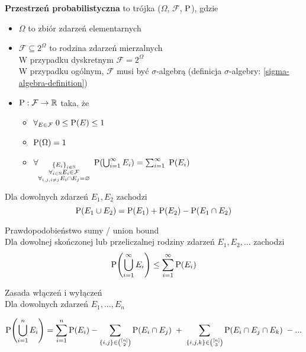 \begin{definition}
	\textbf{Przestrzeń probabilistyczna} to trójka (\(\Omega\), \(\mathcal{F}\), \(\operatorname{P}\)), gdzie
	\begin{itemize}
		\item \(\Omega\) to zbiór zdarzeń elementarnych
		\item \(\mathcal{F} \subseteq 2^{\Omega}\) to rodzina zdarzeń mierzalnych\\
		W przypadku dyskretnym \(\mathcal{F} = 2^{\Omega}\)\\
		W przypadku ogólnym, \(\mathcal{F}\) musi być \(\sigma\)-algebrą (definicja \(\sigma\)-algebry: \ref{sigma-algebra-definition})
		\item \(\operatorname{P} : \mathcal{F} \to \mathbb{R}\) taka, że
		\begin{itemize}
			\item \(\forall_{E \in \mathcal{F}} \; 0 \leq \operatorname{P}(E) \leq 1\)
			\item \(\operatorname{P}(\Omega) = 1\)
			\item \(\forall_{\substack{\set{E_i}_{i \in \natural} \\ \forall_{i \in \natural} E_i \in \mathcal{F} \\ \forall_{i, j, i \not= j} E_i \cap E_j = \emptyset}} \; \prob(\bigcup_{i=1}^\infty E_i) = \sum_{i=1}^\infty \; \prob(E_i)\)
		\end{itemize}
	\end{itemize}
\end{definition}

\begin{lemma}
	Dla dowolnych zdarzeń \(E_1, E_2\) zachodzi
	\[
		\operatorname{P}(E_1 \cup E_2) = \operatorname{P}(E_1) + \operatorname{P}(E_2) - \operatorname{P}(E_1 \cap E_2)
	\]
\end{lemma} 

\begin{lemma} Prawdopodobieństwo sumy / union bound \\
	\label{union-bound}
	Dla dowolnej skończonej lub przeliczalnej rodziny zdarzeń \(E_1, E_2, ...\) zachodzi
	\[
		\prob\pars{\bigcup_{i=1}^\infty E_i} \leq \sum_{i=1}^\infty \prob\pars{E_i}
	\]
\end{lemma}

\begin{lemma} Zasada włączeń i wyłączeń \\
	Dla dowolnych zdarzeń \(E_1, ..., E_n\)
	
	\[
		\prob\pars{\bigcup_{i=1}^n E_i} = \sum_{i=1}^n \prob(E_i) - \sum_{\{i,j\} \in \binom{[n]}{2}} \prob(E_i \cap E_j) \; + \; \sum_{\{i,j,k\} \in \binom{[n]}{3}} \prob(E_i \cap E_j \cap E_k) \; - ...
	\]
\end{lemma}

